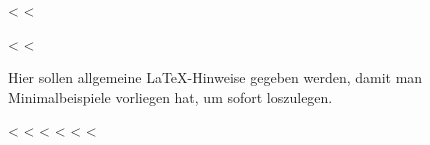 \documentclass[ngerman,runningheads,a4paper]{llncs}[2018/03/10]
\begin{document}
<%
<%
\label{chap:latexhints}

<%
\newcount\LTGbeginlineexample
\newcount\LTGendlineexample
\newenvironment{ltgexample}%
{\LTGbeginlineexample=\numexpr\inputlineno+1\relax}%
{%
\LTGendlineexample=\numexpr\inputlineno-1\relax%

\tcbinputlisting{%
  listing only,
  listing file=\currfilepath,
  colback=green!5!white,
  colframe=green!25,
  coltitle=black!90,
  coltext=black!90,
  left=8mm,
  title=Zugehöriger \LaTeX{}-Quelltext aus \texttt{\currfilepath},
  listing options={%
    language={[LaTeX]TeX},
    firstline=\the\LTGbeginlineexample,
    lastline=\the\LTGendlineexample,
    firstnumber=\the\LTGbeginlineexample,
    basewidth=.5em,
    aboveskip=0mm,
    belowskip=0mm,
    numbers=left,
    xleftmargin=0mm,
    numberstyle=\tiny,
    numbersep=8pt%
  }
}
}%
<%

Hier sollen allgemeine \LaTeX-Hinweise gegeben werden, damit man Minimalbeispiele vorliegen hat, um sofort loszulegen.

<%
<%
<%
<%
<%
<%
\end{document}
